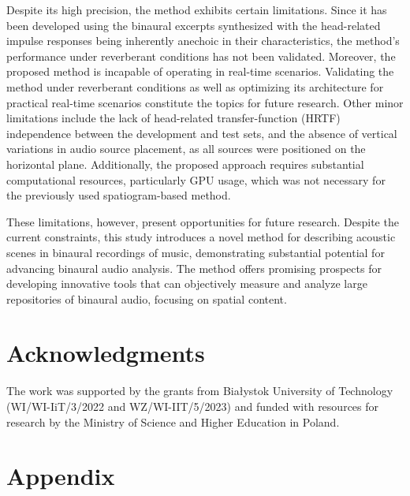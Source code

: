 \documentclass[11pt]{article}
\begin{document}
Despite its high precision, the method exhibits certain limitations. Since it has been developed using the binaural excerpts synthesized with the head-related impulse responses being inherently anechoic in their characteristics, the method's performance under reverberant conditions has not been validated. Moreover, the proposed method is incapable of operating in real-time scenarios. Validating the method under reverberant conditions as well as optimizing its architecture for practical real-time scenarios constitute the topics for future research. Other minor limitations include the lack of head-related transfer-function (HRTF) independence between the development and test sets, and the absence of vertical variations in audio source placement, as all sources were positioned on the horizontal plane. Additionally, the proposed approach requires substantial computational resources, particularly GPU usage, which was not necessary for the previously used spatiogram-based method.

These limitations, however, present opportunities for future research. Despite the current constraints, this study introduces a novel method for describing acoustic scenes in binaural recordings of music, demonstrating substantial potential for advancing binaural audio analysis. The method offers promising prospects for developing innovative tools that can objectively measure and analyze large repositories of binaural audio, focusing on spatial content.

\section*{Acknowledgments}
The work was supported by the grants from Białystok University of Technology (WI/WI-IiT/3/2022 and WZ/WI-IIT/5/2023) and funded with resources for research by the Ministry of Science and Higher Education in Poland.

\section*{Appendix}
\label{appendix:a_hrtf}
\end{document}
